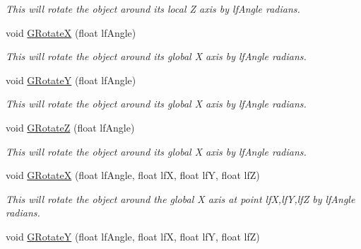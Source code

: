 \begin{DoxyCompactItemize}
\begin{DoxyCompactList}\small\item\em This will rotate the object around its local Z axis by lfAngle radians. \end{DoxyCompactList}\item 
\hypertarget{classc_matrix4_a0be08400d130f819bbedbb35f551d4c7}{
void \hyperlink{classc_matrix4_a0be08400d130f819bbedbb35f551d4c7}{GRotateX} (float lfAngle)}
\label{classc_matrix4_a0be08400d130f819bbedbb35f551d4c7}

\begin{DoxyCompactList}\small\item\em This will rotate the object around its global X axis by lfAngle radians. \end{DoxyCompactList}\item 
\hypertarget{classc_matrix4_a0ae1a3c85f3b00127217b67c7d75a7cc}{
void \hyperlink{classc_matrix4_a0ae1a3c85f3b00127217b67c7d75a7cc}{GRotateY} (float lfAngle)}
\label{classc_matrix4_a0ae1a3c85f3b00127217b67c7d75a7cc}

\begin{DoxyCompactList}\small\item\em This will rotate the object around its global X axis by lfAngle radians. \end{DoxyCompactList}\item 
\hypertarget{classc_matrix4_a1d082ca0f1c634d262309eb75a9e2df5}{
void \hyperlink{classc_matrix4_a1d082ca0f1c634d262309eb75a9e2df5}{GRotateZ} (float lfAngle)}
\label{classc_matrix4_a1d082ca0f1c634d262309eb75a9e2df5}

\begin{DoxyCompactList}\small\item\em This will rotate the object around its global X axis by lfAngle radians. \end{DoxyCompactList}\item 
\hypertarget{classc_matrix4_a517140950c736c74a44d34704b44c83d}{
void \hyperlink{classc_matrix4_a517140950c736c74a44d34704b44c83d}{GRotateX} (float lfAngle, float lfX, float lfY, float lfZ)}
\label{classc_matrix4_a517140950c736c74a44d34704b44c83d}

\begin{DoxyCompactList}\small\item\em This will rotate the object around the global X axis at point lfX,lfY,lfZ by lfAngle radians. \end{DoxyCompactList}\item 
\hypertarget{classc_matrix4_a5b1505c43d9382bc625fc1eb53d44360}{
void \hyperlink{classc_matrix4_a5b1505c43d9382bc625fc1eb53d44360}{GRotateY} (float lfAngle, float lfX, float lfY, float lfZ)}
\label{classc_matrix4_a5b1505c43d9382bc625fc1eb53d44360}


\end{DoxyCompactItemize}
